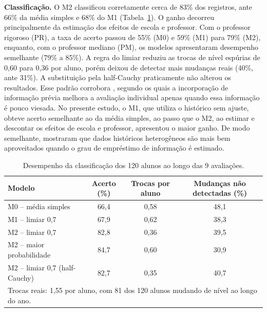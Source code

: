 \documentclass[11pt,a4paper]{article}
\begin{document}
\textbf{Classificação.} O M2 classificou corretamente cerca de 83\% dos registros, ante 66\%
da média simples e 68\% do M1 (Tabela~\ref{tab:modelos}). O ganho decorreu principalmente da
estimação dos efeitos de escola e professor. Com o professor rigoroso (PR), a taxa de acerto
passou de 55\% (M0) e 59\% (M1) para 79\% (M2), enquanto, com o professor mediano (PM), os
modelos apresentaram desempenho semelhante (79\% a 85\%). A regra do limiar reduziu as trocas
de nível espúrias de 0,60 para 0,36 por aluno, porém deixou de detectar mais mudanças reais
(40\%, ante 31\%). A substituição pela half-Cauchy praticamente não alterou os resultados.
Esse padrão corrobora \citet{zitzmann2025}, segundo os quais a incorporação de informação
prévia melhora a avaliação individual apenas quando essa informação é pouco viesada. No
presente estudo, o M1, que utiliza o histórico sem ajuste, obteve acerto semelhante ao da
média simples, ao passo que o M2, ao estimar e descontar os efeitos de escola e professor,
apresentou o maior ganho. De modo semelhante, \citet{kaplan2023} mostraram que dados
históricos heterogêneos são mais bem aproveitados quando o grau de empréstimo de informação é
estimado.

\begin{table}[h]
  \centering
  \caption{Desempenho da classificação dos 120 alunos ao longo das 9 avaliações.}
  \label{tab:modelos}
  \small
  \begin{tabular}{lccc}
    \toprule
    Modelo & Acerto (\%) & Trocas por aluno & Mudanças não detectadas (\%) \\
    \midrule
    M0 -- média simples              & 66,4 & 0,58 & 48,1 \\
    M1 -- limiar 0,7                 & 67,9 & 0,62 & 38,3 \\
    M2 -- limiar 0,7                 & 82,8 & 0,36 & 39,5 \\
    M2 -- maior probabilidade        & 84,7 & 0,60 & 30,9 \\
    M2 -- limiar 0,7 (half-Cauchy)   & 82,7 & 0,35 & 40,7 \\
    \bottomrule
    \multicolumn{4}{l}{\footnotesize Trocas reais: 1,55 por aluno, com 81 dos 120 alunos mudando de nível ao longo do ano.}
  \end{tabular}
\end{table}
\end{document}
